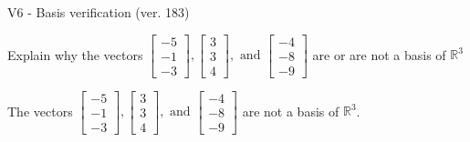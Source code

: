\begin{exercise}
  \begin{exerciseTitle}V6 - Basis verification (ver. 183)\end{exerciseTitle}
  \begin{exerciseStatement}
    Explain why the vectors \(\left[\begin{array}{r}
-5 \\
-1 \\
-3
\end{array}\right] , \left[\begin{array}{r}
3 \\
3 \\
4
\end{array}\right] , \text{ and } \left[\begin{array}{r}
-4 \\
-8 \\
-9
\end{array}\right]\) are or are not a basis of \(\mathbb{R}^3\)	


  \end{exerciseStatement}
  \begin{exerciseAnswer}
   The vectors \(\left[\begin{array}{r}
-5 \\
-1 \\
-3
\end{array}\right] , \left[\begin{array}{r}
3 \\
3 \\
4
\end{array}\right] , \text{ and } \left[\begin{array}{r}
-4 \\
-8 \\
-9
\end{array}\right]\) 
  	 are not  a basis of \(\mathbb{R}^3\).
  


  \end{exerciseAnswer}
\end{exercise}